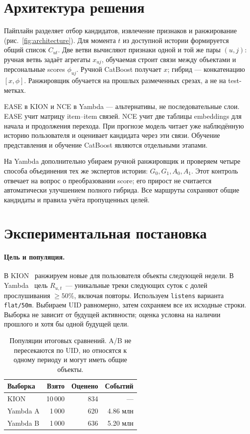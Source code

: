\documentclass[10pt,a4paper,twocolumn]{article}
\newcommand{\KionUsers}{834}
\newcommand{\YambdaUsers}{620}
\newcommand{\NewUsers}{636}
\begin{document}
\section{Архитектура решения}

Пайплайн разделяет отбор кандидатов, извлечение признаков и ранжирование
(рис.~\ref{fig:architecture}). Для момента $t$ из доступной истории
формируется общий список $C_{ut}$. Две ветви вычисляют признаки одной
и той же пары $(u,j)$: ручная ветвь задаёт агрегаты $x_{uj}$, обучаемая
строит связи между объектами и персональные scores $\phi_{uj}$.
Ручной CatBoost получает $x$; гибрид --- конкатенацию $[x,\phi]$.
Ранжировщик обучается на прошлых размеченных срезах, а не на test-метках.

EASE в KION и NCE в Yambda --- альтернативы, не последовательные слои.
EASE учит матрицу item--item связей. NCE учит две таблицы embeddings
для начала и продолжения перехода. При прогнозе модель читает уже
наблюдённую историю пользователя и оценивает кандидата через эти связи.
Обучение представления и обучение CatBoost являются отдельными этапами.

На Yambda дополнительно убираем ручной ранжировщик и проверяем четыре
способа объединения тех же экспертов истории: $G_0,G_1,A_0,A_1$.
Этот контроль отвечает на вопрос о преобразовании score;
его прирост не считается автоматически улучшением полного гибрида.
Все маршруты сохраняют общие кандидаты и правила учёта пропущенных целей.

\section{Экспериментальная постановка}

\paragraph{Цель и популяция.}
В KION~\cite{kion} ранжируем новые для пользователя объекты следующей недели.
В Yambda~\cite{yambda} цель $R_{u,t}$~--- уникальные треки следующих суток
с долей прослушивания $\ge50\%$, включая повторы. Используем \texttt{listens}
варианта \texttt{flat/50m}. Выбираем UID равномерно, затем сохраняем все
их исходные строки. Выборка не зависит от будущей активности;
оценка условна на наличии прошлого и хотя бы одной будущей цели.

\begin{table}[t]
\centering\small
\caption{Популяции итоговых сравнений. A/B не пересекаются по UID,
но относятся к одному периоду и могут иметь общие объекты.}
\label{tab:data}
\begin{tabular}{@{}lrrr@{}}\toprule
Выборка & Взято & Оценено & Событий\\\midrule
KION & 10\,000 & \KionUsers & ---\\
Yambda A & 1\,000 & \YambdaUsers & 4.86 млн\\
Yambda B & 1\,000 & \NewUsers & 5.20 млн\\\bottomrule
\end{tabular}
\end{table}
\end{document}
